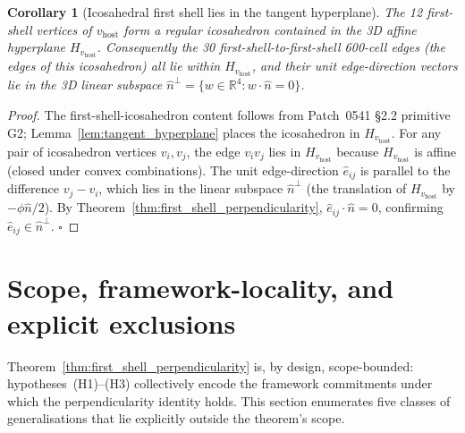 \documentclass[11pt,letterpaper]{article}
\newtheorem{corollary}[theorem]{Corollary}
\newcommand{\nhat}{\hat{n}}
\newcommand{\vhost}{v_{\text{host}}}
\newcommand{\Reals}{\mathbb{R}}
\newcommand{\Hperp}{H_{\vhost}}
\begin{document}
\begin{corollary}[Icosahedral first shell lies in the tangent hyperplane]\label{cor:icosahedron_in_tangent}
The 12 first-shell vertices of $\vhost$ form a regular icosahedron contained in the 3D affine hyperplane $\Hperp$. Consequently the 30 first-shell-to-first-shell 600-cell edges (the edges of this icosahedron) all lie within $\Hperp$, and their unit edge-direction vectors lie in the 3D linear subspace $\nhat^\perp = \{w \in \Reals^4 : w\cdot\nhat = 0\}$.
\end{corollary}

\begin{proof}
The first-shell-icosahedron content follows from Patch~0541 \S2.2 primitive G2; Lemma~\ref{lem:tangent_hyperplane} places the icosahedron in $\Hperp$. For any pair of icosahedron vertices $v_i, v_j$, the edge $v_i v_j$ lies in $\Hperp$ because $\Hperp$ is affine (closed under convex combinations). The unit edge-direction $\hat{e}_{ij}$ is parallel to the difference $v_j - v_i$, which lies in the linear subspace $\nhat^\perp$ (the translation of $\Hperp$ by $-\phi\nhat/2$). By Theorem~\ref{thm:first_shell_perpendicularity}, $\hat{e}_{ij} \cdot \nhat = 0$, confirming $\hat{e}_{ij} \in \nhat^\perp$. $\square$
\end{proof}

\section{Scope, framework-locality, and explicit exclusions}\label{sec:scope_and_exclusions}

Theorem~\ref{thm:first_shell_perpendicularity} is, by design, scope-bounded: hypotheses~(H1)--(H3) collectively encode the framework commitments under which the perpendicularity identity holds. This section enumerates five classes of generalisations that lie explicitly outside the theorem's scope.
\end{document}
